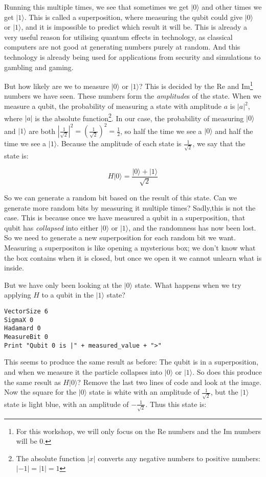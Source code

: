 \documentclass[twocolumn]{article}
\begin{document}
Running this multiple times, we see that sometimes we get $|0\rangle$ and other times we get $|1\rangle$. This is called a superposition, where measuring the qubit could give $|0\rangle$ or $|1\rangle$, and it is impossible to predict which result it will be. This is already a very useful reason for utilising quantum effects in technology, as classical computers are not good at generating numbers purely at random. And this technology is already being used for applications from security and simulations to gambling and gaming.

But how likely are we to measure $|0\rangle$ or $|1\rangle$? This is decided by the Re and Im\footnote{For this workshop, we will only focus on the Re numbers and the Im numbers will be $0$.} numbers we have seen. These numbers form the {\em amplitude}s of the state. When we measure a qubit, the probability of measuring a state with amplitude $a$ is $|a|^2$, where $|a|$ is the absolute function\footnote{The absolute function $|x|$ converts any negative numbers to positive numbers: $|-1| = |1| = 1$}. In our case, the probability of measuring $|0\rangle$ and $|1\rangle$ are both $\left|\frac{1}{\sqrt{2}}\right|^2 = \left(\frac{1}{\sqrt{2}}\right)^2 = \frac{1}{2}$, so half the time we see a $|0\rangle$ and half the time we see a $|1\rangle$. Because the amplitude of each state is $\frac{1}{\sqrt{2}}$, we say that the state is:

$$H|0\rangle = \frac{|0\rangle + |1\rangle}{\sqrt{2}}$$

So we can generate a random bit based on the result of this state. Can we generate more random bits by measuring it multiple times? Sadly,this is not the case. This is because once we have measured a qubit in a superposition, that qubit has {\em collapsed} into either $|0\rangle$ or $|1\rangle$, and the randomness has now been lost. So we need to generate a new superposition for each random bit we want. Measuring a superpositon is like opening a mysterious box; we don't know what the box contains when it is closed, but once we open it we cannot unlearn what is inside.

But we have only been looking at the $|0\rangle$ state. What happens when we try applying $H$ to a qubit in the $|1\rangle$ state?

\begin{lstlisting}
VectorSize 6
SigmaX 0
Hadamard 0
MeasureBit 0
Print "Qubit 0 is |" + measured_value + ">"
\end{lstlisting}

This seems to produce the same result as before: The qubit is in a superposition, and when we measure it the particle collapses into $|0\rangle$ or $|1\rangle$. So does this produce the same result as $H|0\rangle$? Remove the last two lines of code and look at the image. Now the square for the $|0\rangle$ state is white with an amplitude of $\frac{1}{\sqrt{2}}$, but the $|1\rangle$ state is light blue, with an amplitude of $-\frac{1}{\sqrt{2}}$. Thus this state is:
\end{document}
